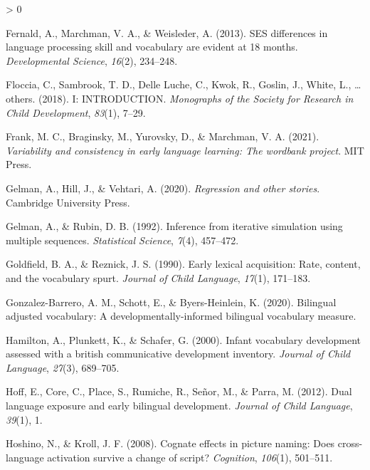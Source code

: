 \documentclass[
  english,
  man,man,floatsintext]{apa6}
\newlength{\cslhangindent}
\newenvironment{CSLReferences}[2] %
 {%
  \setlength{\parindent}{0pt}
  \ifodd #1 \everypar{\setlength{\hangindent}{\cslhangindent}}\ignorespaces\fi
  \ifnum #2 > 0
  \setlength{\parskip}{#2\baselineskip}
  \fi
 }%
 {}
\begin{document}
\begin{CSLReferences}{1}{0}
\leavevmode\hypertarget{ref-fernald2013ses}{}%
Fernald, A., Marchman, V. A., \& Weisleder, A. (2013). SES differences in language processing skill and vocabulary are evident at 18 months. \emph{Developmental Science}, \emph{16}(2), 234--248.

\leavevmode\hypertarget{ref-floccia2018introduction}{}%
Floccia, C., Sambrook, T. D., Delle Luche, C., Kwok, R., Goslin, J., White, L., \ldots{} others. (2018). I: INTRODUCTION. \emph{Monographs of the Society for Research in Child Development}, \emph{83}(1), 7--29.

\leavevmode\hypertarget{ref-frank2021variability}{}%
Frank, M. C., Braginsky, M., Yurovsky, D., \& Marchman, V. A. (2021). \emph{Variability and consistency in early language learning: The wordbank project}. MIT Press.

\leavevmode\hypertarget{ref-gelman2020regression}{}%
Gelman, A., Hill, J., \& Vehtari, A. (2020). \emph{Regression and other stories}. Cambridge University Press.

\leavevmode\hypertarget{ref-gelman1992inference}{}%
Gelman, A., \& Rubin, D. B. (1992). Inference from iterative simulation using multiple sequences. \emph{Statistical Science}, \emph{7}(4), 457--472.

\leavevmode\hypertarget{ref-goldfield1990early}{}%
Goldfield, B. A., \& Reznick, J. S. (1990). Early lexical acquisition: Rate, content, and the vocabulary spurt. \emph{Journal of Child Language}, \emph{17}(1), 171--183.

\leavevmode\hypertarget{ref-gonzalez2020bilingual}{}%
Gonzalez-Barrero, A. M., Schott, E., \& Byers-Heinlein, K. (2020). Bilingual adjusted vocabulary: A developmentally-informed bilingual vocabulary measure.

\leavevmode\hypertarget{ref-hamilton2000infant}{}%
Hamilton, A., Plunkett, K., \& Schafer, G. (2000). Infant vocabulary development assessed with a british communicative development inventory. \emph{Journal of Child Language}, \emph{27}(3), 689--705.

\leavevmode\hypertarget{ref-hoff2012dual}{}%
Hoff, E., Core, C., Place, S., Rumiche, R., Señor, M., \& Parra, M. (2012). Dual language exposure and early bilingual development. \emph{Journal of Child Language}, \emph{39}(1), 1.

\leavevmode\hypertarget{ref-hoshino2008cognate}{}%
Hoshino, N., \& Kroll, J. F. (2008). Cognate effects in picture naming: Does cross-language activation survive a change of script? \emph{Cognition}, \emph{106}(1), 501--511.


\end{CSLReferences}
\end{document}
